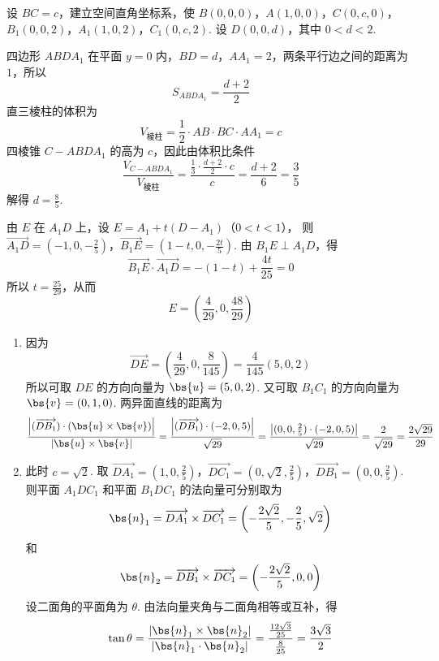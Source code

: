 \begin{solution}
设 \(BC=c\)，建立空间直角坐标系，使 \(B(0,0,0)\)，\(A(1,0,0)\)，\(C(0,c,0)\)，\(B_{1}(0,0,2)\)，\(A_{1}(1,0,2)\)，\(C_{1}(0,c,2)\).
设 \(D(0,0,d)\)，其中 \(0<d<2\).

四边形 \(ABDA_{1}\) 在平面 \(y=0\) 内，\(BD=d\)，\(AA_{1}=2\)，两条平行边之间的距离为 \(1\)，所以
\[
S_{ABDA_{1}}=\frac{d+2}{2}
\]
直三棱柱的体积为
\[
V_{\text{棱柱}}=\frac{1}{2}\cdot AB\cdot BC\cdot AA_{1}=c
\]
四棱锥 \(C-ABDA_{1}\) 的高为 \(c\)，因此由体积比条件
\[
\frac{V_{C-ABDA_{1}}}{V_{\text{棱柱}}}
=\frac{\frac{1}{3}\cdot\frac{d+2}{2}\cdot c}{c}
=\frac{d+2}{6}
=\frac{3}{5}
\]
解得 \(d=\frac{8}{5}\).

由 \(E\) 在 \(A_{1}D\) 上，设
\(E=A_{1}+t(D-A_{1})\)（\(0<t<1\)），
则
\(\overrightarrow{A_{1}D}=\left(-1,0,-\frac{2}{5}\right)\)，\(\overrightarrow{B_{1}E}=\left(1-t,0,-\frac{2t}{5}\right)\).
由 \(B_{1}E\perp A_{1}D\)，得
\[
\overrightarrow{B_{1}E}\cdot\overrightarrow{A_{1}D}
=-(1-t)+\frac{4t}{25}=0
\]
所以 \(t=\frac{25}{29}\)，从而
\[
E=\left(\frac{4}{29},0,\frac{48}{29}\right)
\]
\begin{enumerate}
\item 因为
\[
\overrightarrow{DE}=\left(\frac{4}{29},0,\frac{8}{145}\right)
=\frac{4}{145}(5,0,2)
\]
所以可取 \(DE\) 的方向向量为 \(\bs{u}=(5,0,2)\). 又可取 \(B_{1}C_{1}\) 的方向向量为 \(\bs{v}=(0,1,0)\). 两异面直线的距离为
\[
\frac{\left|(\overrightarrow{DB_{1}})\cdot(\bs{u}\times\bs{v})\right|}
{|\bs{u}\times\bs{v}|}
=\frac{\left|(\overrightarrow{DB_{1}})\cdot(-2,0,5)\right|}{\sqrt{29}}
=\frac{\left|(0,0,\frac{2}{5})\cdot(-2,0,5)\right|}{\sqrt{29}}
=\frac{2}{\sqrt{29}}
=\frac{2\sqrt{29}}{29}
\]
\item 此时 \(c=\sqrt{2}\). 取 \(\overrightarrow{DA_{1}}=\left(1,0,\frac{2}{5}\right)\)，\(\overrightarrow{DC_{1}}=\left(0,\sqrt{2},\frac{2}{5}\right)\)，\(\overrightarrow{DB_{1}}=\left(0,0,\frac{2}{5}\right)\).
则平面 \(A_{1}DC_{1}\) 和平面 \(B_{1}DC_{1}\) 的法向量可分别取为
\[
\bs{n}_{1}=\overrightarrow{DA_{1}}\times\overrightarrow{DC_{1}}
=\left(-\frac{2\sqrt{2}}{5},-\frac{2}{5},\sqrt{2}\right)
\]
和
\[
\bs{n}_{2}=\overrightarrow{DB_{1}}\times\overrightarrow{DC_{1}}
=\left(-\frac{2\sqrt{2}}{5},0,0\right)
\]
设二面角的平面角为 \(\theta\). 由法向量夹角与二面角相等或互补，得
\[
\tan\theta
=\frac{|\bs{n}_{1}\times\bs{n}_{2}|}{|\bs{n}_{1}\cdot\bs{n}_{2}|}
=\frac{\frac{12\sqrt{3}}{25}}{\frac{8}{25}}
=\frac{3\sqrt{3}}{2}
\]
\end{enumerate}
\end{solution}

